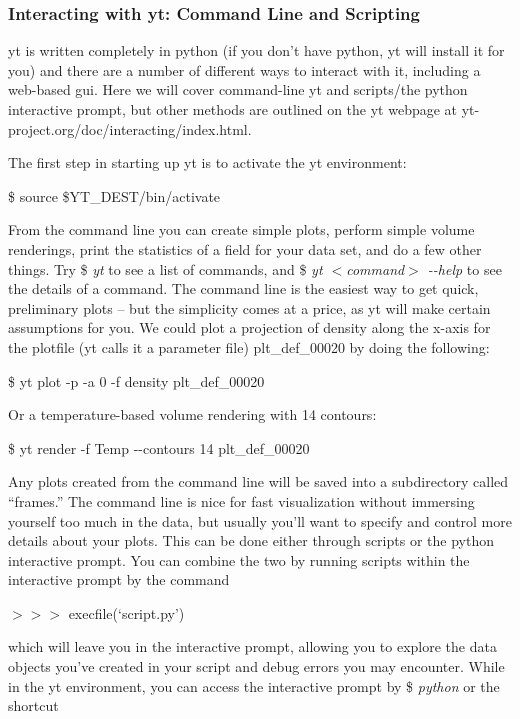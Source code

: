 \subsubsection{Interacting with yt: Command Line and Scripting}

yt is written completely in python (if you don't have python, yt will install it for you)  and there are a number of different ways to interact with it, including a web-based gui. Here we will cover command-line yt and scripts/the python interactive prompt, but other methods are outlined on the yt webpage at yt-project.org/doc/interacting/index.html.

The first step in starting up yt is to activate the yt environment:

\$ source \$YT\_DEST/bin/activate

From the command line you can create simple plots, perform simple volume renderings, print the statistics of a field for your data set, and do a few other things. Try {\$ \it yt}  to see a list of commands, and {\$ \it yt {\footnotesize$<$}command{\footnotesize$>$} -{}-help}  to see the details of a command. The command line is the easiest way to get quick, preliminary plots -- but the simplicity comes at a price, as yt will make certain assumptions for you. We could plot a projection of density along the x-axis for the plotfile (yt calls it a parameter file) plt\_def\_00020 by doing the following:

\$ yt plot -p -a 0 -f density plt\_def\_00020

Or a temperature-based volume rendering with 14 contours:

\$ yt render -f Temp -{}-contours 14 plt\_def\_00020

Any plots created from the command line will be saved into a subdirectory called ``frames.'' The command line is nice for fast visualization without immersing yourself too much in the data, but usually you'll want to specify and control more details about your plots. This can be done either through scripts or the python interactive prompt. You can combine the two by running scripts within the interactive prompt by the command

{\scriptsize$>>>$} execfile(`script.py')

which will leave you in the interactive prompt, allowing you to explore the data objects you've created in your script and debug errors you may encounter. While in the yt environment, you can access the interactive prompt by {\$ \it python} or the shortcut

